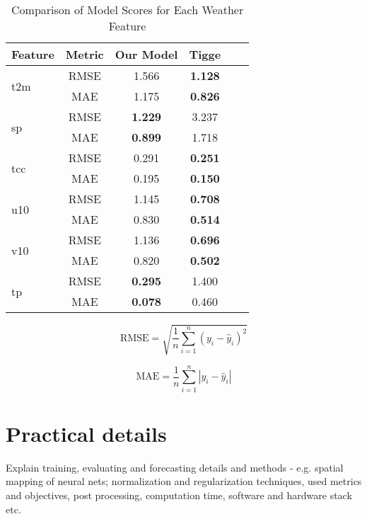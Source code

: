 \begin{table}[ht]
\centering
\caption{Comparison of Model Scores for Each Weather Feature}
\label{tab:model_scores}
\begin{tabular}{lccccc}
\toprule
\textbf{Feature} & \textbf{Metric} & \textbf{Our Model} & \textbf{Tigge} \\
\midrule
\multirow{2}{*}{t2m} & RMSE & 1.566 & \textbf{1.128} \\
                     & MAE  & 1.175 & \textbf{0.826}\\
\midrule
\multirow{2}{*}{sp}  & RMSE & \textbf{1.229} & 3.237  \\
                     & MAE  & \textbf{0.899} & 1.718  \\
\midrule
\multirow{2}{*}{tcc} & RMSE & 0.291 & \textbf{0.251}  \\
                     & MAE  & 0.195 & \textbf{0.150} \\
\midrule
\multirow{2}{*}{u10} & RMSE & 1.145 & \textbf{0.708}  \\
                     & MAE  & 0.830 & \textbf{0.514}  \\
\midrule
\multirow{2}{*}{v10} & RMSE & 1.136 & \textbf{0.696}  \\
                     & MAE  & 0.820 & \textbf{0.502} \\
\midrule
\multirow{2}{*}{tp}  & RMSE & \textbf{0.295} & 1.400  \\
                     & MAE  & \textbf{0.078} & 0.460 \\
\bottomrule
\end{tabular}
\end{table}

\[
\text{RMSE} = \sqrt{\frac{1}{n} \sum_{i=1}^{n} (y_i - \hat{y}_i)^2}
\]

\[
\text{MAE} = \frac{1}{n} \sum_{i=1}^{n} |y_i - \hat{y}_i|
\]

\section{Practical details}
Explain training, evaluating and forecasting details and methods - e.g. spatial mapping of neural nets;
normalization and regularization techniques, used metrics and objectives, post processing, computation time, software and hardware stack etc. 
